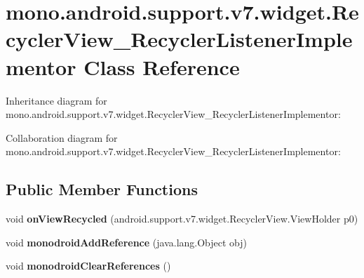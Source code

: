 \hypertarget{classmono_1_1android_1_1support_1_1v7_1_1widget_1_1_recycler_view___recycler_listener_implementor}{}\section{mono.\+android.\+support.\+v7.\+widget.\+Recycler\+View\+\_\+\+Recycler\+Listener\+Implementor Class Reference}
\label{classmono_1_1android_1_1support_1_1v7_1_1widget_1_1_recycler_view___recycler_listener_implementor}


Inheritance diagram for mono.\+android.\+support.\+v7.\+widget.\+Recycler\+View\+\_\+\+Recycler\+Listener\+Implementor\+:


Collaboration diagram for mono.\+android.\+support.\+v7.\+widget.\+Recycler\+View\+\_\+\+Recycler\+Listener\+Implementor\+:
\subsection*{Public Member Functions}
\begin{DoxyCompactItemize}
\item 
\mbox{\label{classmono_1_1android_1_1support_1_1v7_1_1widget_1_1_recycler_view___recycler_listener_implementor_a5454da38aec32481ec8ce7f5150d064d}} 
void {\bfseries on\+View\+Recycled} (android.\+support.\+v7.\+widget.\+Recycler\+View.\+View\+Holder p0)
\item 
\mbox{\label{classmono_1_1android_1_1support_1_1v7_1_1widget_1_1_recycler_view___recycler_listener_implementor_a47b5f1d0a3a4ddc09d2f8a1727069ad8}} 
void {\bfseries monodroid\+Add\+Reference} (java.\+lang.\+Object obj)
\item 
\mbox{\label{classmono_1_1android_1_1support_1_1v7_1_1widget_1_1_recycler_view___recycler_listener_implementor_a70d9d815893736085322f6ed97dfad5e}} 
void {\bfseries monodroid\+Clear\+References} ()
\end{DoxyCompactItemize}
